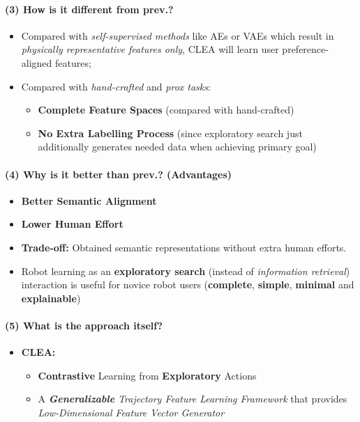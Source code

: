 \documentclass{article}
\begin{document}
\paragraph{(3) How is it different from prev.?}
\begin{itemize}
  \item Compared with \textit{self-supervised methods} like AEs or VAEs which result in \textit{physically representative features only}, CLEA will learn user preference-aligned features;
  \item Compared with \textit{hand-crafted} and \textit{prox tasks}:
  \begin{itemize}
    \item \textbf{Complete Feature Spaces} (compared with hand-crafted)
    \item \textbf{No Extra Labelling Process} (since exploratory search just additionally generates needed data when achieving primary goal)
  \end{itemize}
\end{itemize}

\paragraph{(4) Why is it better than prev.? (Advantages)} 
\begin{itemize}
  \item \textbf{Better Semantic Alignment}
  \item \textbf{Lower Human Effort}
  \item \textbf{Trade-off:} Obtained semantic representations without extra human efforts.
  \item Robot learning as an \textbf{exploratory search} (instead of \textit{information retrieval}) interaction is useful for novice robot users (\textbf{complete}, \textbf{simple}, \textbf{minimal} and \textbf{explainable})
\end{itemize}

\paragraph{(5) What is the approach itself?}
\begin{itemize}
  \item \textbf{CLEA:}
  \begin{itemize}
    \item \textbf{Contrastive} Learning from \textbf{Exploratory} Actions
    \item A \textit{\textbf{Generalizable} Trajectory Feature Learning Framework} that provides \textit{Low-Dimensional Feature Vector Generator}
  \end{itemize}
\end{itemize}
\end{document}
